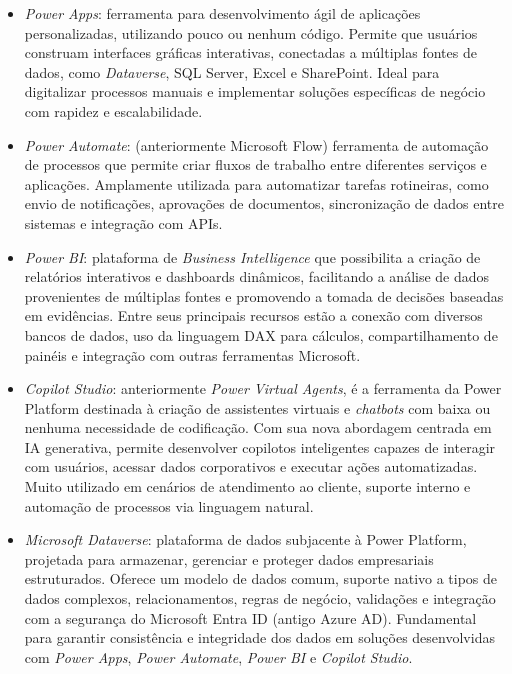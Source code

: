 	\begin{itemize}
		\item \textit{Power Apps}: ferramenta para desenvolvimento ágil de aplicações personalizadas, utilizando pouco ou nenhum código. Permite que usuários construam interfaces gráficas interativas, conectadas a múltiplas fontes de dados, como \textit{Dataverse}, SQL Server, Excel e SharePoint. Ideal para digitalizar processos manuais e implementar soluções específicas de negócio com rapidez e escalabilidade.

		\item \textit{Power Automate}: (anteriormente Microsoft Flow) ferramenta de automação de processos que permite criar fluxos de trabalho entre diferentes serviços e aplicações. Amplamente utilizada para automatizar tarefas rotineiras, como envio de notificações, aprovações de documentos, sincronização de dados entre sistemas e integração com APIs.

		\item \textit{Power BI}: plataforma de \textit{Business Intelligence} que possibilita a criação de relatórios interativos e dashboards dinâmicos, facilitando a análise de dados provenientes de múltiplas fontes e promovendo a tomada de decisões baseadas em evidências. Entre seus principais recursos estão a conexão com diversos bancos de dados, uso da linguagem DAX para cálculos, compartilhamento de painéis e integração com outras ferramentas Microsoft.

		\item \textit{Copilot Studio}: anteriormente \textit{Power Virtual Agents}, é a ferramenta da Power Platform destinada à criação de assistentes virtuais e \textit{chatbots} com baixa ou nenhuma necessidade de codificação. Com sua nova abordagem centrada em IA generativa, permite desenvolver copilotos inteligentes capazes de interagir com usuários, acessar dados corporativos e executar ações automatizadas. Muito utilizado em cenários de atendimento ao cliente, suporte interno e automação de processos via linguagem natural.

		\item \textit{Microsoft Dataverse}: plataforma de dados subjacente à Power Platform, projetada para armazenar, gerenciar e proteger dados empresariais estruturados. Oferece um modelo de dados comum, suporte nativo a tipos de dados complexos, relacionamentos, regras de negócio, validações e integração com a segurança do Microsoft Entra ID (antigo Azure AD). Fundamental para garantir consistência e integridade dos dados em soluções desenvolvidas com \textit{Power Apps}, \textit{Power Automate}, \textit{Power BI} e \textit{Copilot Studio}.
	\end{itemize}

